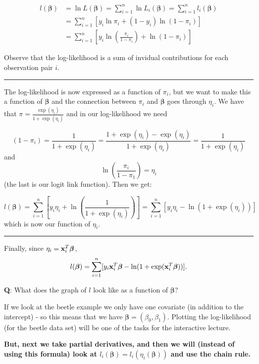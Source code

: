 \documentclass[
]{article}
\begin{document}
\begin{align}
l(\boldsymbol{\beta})&=\ln L(\boldsymbol{\beta})=\sum_{i=1}^n \ln L_i(\boldsymbol{\beta})=\sum_{i=1}^n l_i(\boldsymbol{\beta})\\
&=\sum_{i=1}^n[y_i \ln \pi_i+(1-y_i) \ln(1-\pi_i)]\\
&=\sum_{i=1}^n[y_i \ln (\frac{\pi_i}{1-\pi_i})+\ln(1-\pi_i)]
\end{align}

Observe that the log-likelihood is a sum of invidual contributions for
each observation pair \(i\).

\begin{center}\rule{0.5\linewidth}{0.5pt}\end{center}

The log-likelihood is now expressed as a function of \(\pi_i\), but we
want to make this a function of \(\boldsymbol{\beta}\) and the
connection between \(\pi_i\) and \(\boldsymbol{\beta}\) goes through
\(\eta_i\). We have that \(\pi=\frac{\exp(\eta_i)}{1+\exp(\eta_i)}\) and
in our log-likelihood we need

\[(1-\pi_i)=\frac{1}{1+\exp(\eta_i)}=\frac{1+\exp(\eta_i)-\exp(\eta_i)}{1+\exp(\eta_i)}=\frac{1}{1+\exp(\eta_i)}\]
and \[\ln(\frac{\pi_i}{1-\pi_1})=\eta_i\] (the last is our logit link
function). Then we get:

\[l(\boldsymbol{\beta})=\sum_{i=1}^n[y_i \eta_i + \ln (\frac{1}{1+\exp(\eta_i)})]=\sum_{i=1}^n[y_i \eta_i - \ln (1+\exp(\eta_i))]\]
which is now our function of \(\eta_i\).

\begin{center}\rule{0.5\linewidth}{0.5pt}\end{center}

Finally, since \(\eta_i={\bf x}_i^T \boldsymbol{\beta}\),
\[l(\boldsymbol{\beta})=\sum_{i=1}^n[y_i {\bf x}_i^T \boldsymbol{\beta} - \ln (1+\exp({\bf x}_i^T \boldsymbol{\beta}))].\]

\textbf{Q}: What does the graph of \(l\) look like as a function of
\(\boldsymbol{\beta}\)?

If we look at the beetle example we only have one covariate (in addition
to the intercept) - so this means that we have
\(\boldsymbol{\beta}=(\beta_0,\beta_1)\). Plotting the log-likelihood
(for the beetle data set) will be one of the tasks for the interactive
lecture.

\textbf{But, next we take partial derivatives, and then we will (instead
of using this formula) look at
\(l_i(\boldsymbol{\beta})=l_i(\eta_i(\boldsymbol{\beta}))\) and use the
chain rule.}
\end{document}
